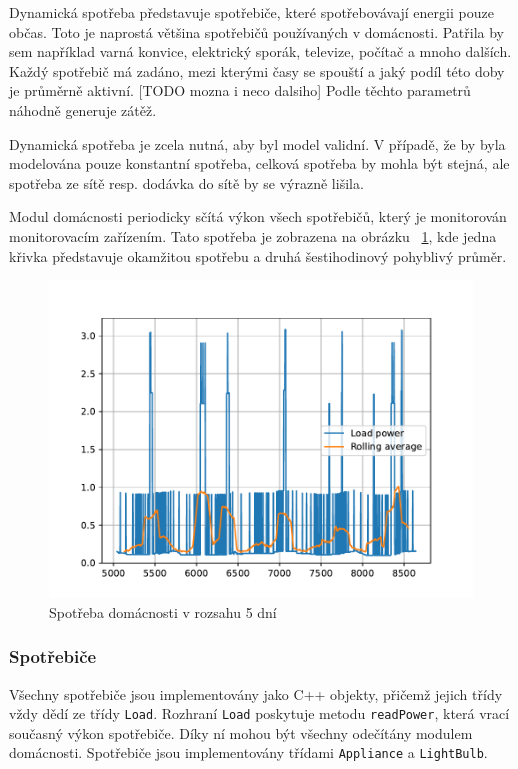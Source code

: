 \documentclass[12pt,a4paper]{article}
\begin{document}
Dynamická spotřeba představuje spotřebiče, které spotřebovávají energii pouze občas.
Toto je naprostá většina spotřebičů používaných v domácnosti.
Patřila by sem například varná konvice, elektrický sporák, televize, počítač a mnoho dalších.
Každý spotřebič má zadáno, mezi kterými časy se spouští a jaký podíl této doby je průměrně aktivní. [TODO mozna i neco dalsiho]
Podle těchto parametrů náhodně generuje zátěž.

Dynamická spotřeba je zcela nutná, aby byl model validní.
V případě, že by byla modelována pouze konstantní spotřeba,
celková spotřeba by mohla být stejná, ale spotřeba ze sítě resp. dodávka do sítě by se výrazně lišila.

Modul domácnosti periodicky sčítá výkon všech spotřebičů, který je monitorován monitorovacím zařízením.
Tato spotřeba je zobrazena na obrázku ~\ref{fig:load_power},
kde jedna křivka představuje okamžitou spotřebu a druhá šestihodinový pohyblivý průměr.

\begin{figure}
\includegraphics[width=\linewidth]{img/load_power.pdf}
\caption{Spotřeba domácnosti v rozsahu 5 dní}
\label{fig:load_power}
\end{figure}

\subsubsection{Spotřebiče}
Všechny spotřebiče jsou implementovány jako C++ objekty, přičemž jejich třídy vždy dědí ze třídy \texttt{Load}.
Rozhraní \texttt{Load} poskytuje metodu \texttt{readPower}, která vrací současný výkon spotřebiče.
Díky ní mohou být všechny odečítány modulem domácnosti.
Spotřebiče jsou implementovány třídami \texttt{Appliance} a \texttt{LightBulb}.
\end{document}
